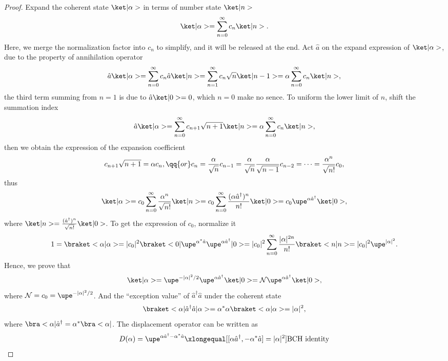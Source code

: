 \begin{solution}\leavevmode
  \begin{enumext}
    \item \begin{proof}
    Expand the coherent state $\ket|\alpha>$ in terms of number state $\ket|n>$
    \[
      \ket|\alpha> = \sum_{n=0}^\infty c_n \ket|n>.
    \]
    Here, we merge the normalization factor into $c_n$ to simplify, and it will be released at the end. Act $\hat a$ on the expand expression of $\ket|\alpha>$, due to the property of annihilation operator
    \[
      \hat a \ket|\alpha> = \sum_{n=0}^\infty c_n \hat a \ket|n>
    = \sum_{n=1}^\infty c_n \sqrt n \ket|n - 1>
    = \alpha \sum_{n=0}^\infty c_n \ket|n>,
    \]
    the third term summing from $n = 1$ is due to $\hat a\ket|0> = 0$,
    which $n = 0$ make no sence. To uniform the lower limit of $n$,
    shift the summation index
    \[
      \hat a \ket|\alpha>
    = \sum_{n=0}^\infty c_{n+1} \sqrt{n + 1} \ket|n>
    = \alpha \sum_{n=0}^\infty c_n \ket|n>,
    \]
    then we obtain the expression of the expansion coefficient
    \[
      c_{n+1} \sqrt{n + 1} = \alpha c_n, \qq{or}
      c_n = \frac\alpha{\sqrt n} c_{n-1}
    = \frac\alpha{\sqrt n} \frac\alpha{\sqrt{n - 1}} c_{n-2} = \cdots
    = \frac{\alpha^n}{\sqrt{n!}} c_0,
    \]
    thus
    \[
      \ket|\alpha> = c_0 \sum_{n=0}^\infty \frac{\alpha^n}{\sqrt{n!}} \ket|n>
    = c_0 \sum_{n=0}^\infty \frac{(\alpha \hat a^\dagger)^n}{n!} \ket|0>
    = c_0 \upe^{\alpha \hat a^\dagger} \ket|0>,
    \]
    where $\ket|n> = \frac{(\hat a^\dagger)^n}{\sqrt{n!}}\ket|0>$.
    To get the expression of $c_0$, normalize it
    \[
      1 = \braket<\alpha|\alpha> = |c_0|^2
      \braket<0|\upe^{\alpha^*\hat a} \upe^{\alpha\hat a^\dagger}|0>
    = |c_0|^2 \sum_{n=0}^\infty \frac{|\alpha|^{2n}}{n!} \braket<n|n>
    = |c_0|^2 \upe^{|\alpha|^2}.
    \]
    Hence, we prove that
    \[
      \ket|\alpha> = \upe^{-|\alpha|^2/2} \upe^{\alpha \hat a^\dagger} \ket|0>
    = \mathcal N \upe^{\alpha \hat a^\dagger} \ket|0>,
    \]
    where $\mathcal N = c_0 = \upe^{-|\alpha|^2/2}$.
    And the ``exception value'' of $\hat a^\dagger \hat a$ under the coherent state
    \[
      \braket<\alpha|\hat a^\dagger \hat a|\alpha>
    = \alpha^*\alpha\braket<\alpha|\alpha> = |\alpha|^2,
    \]
    where $\bra<\alpha|\hat a^\dagger = \alpha^* \bra<\alpha|$.
    The displacement operator can be written as
    \[
      D(\alpha) = \upe^{\alpha \hat a^\dagger - \alpha^*\hat a}
    \xlongequal[{[\alpha\hat a^\dagger, -\alpha^*\hat a] = |\alpha|^2}]{\text{BCH identity}}
\]
\end{proof}
\end{enumext}
\end{solution}
